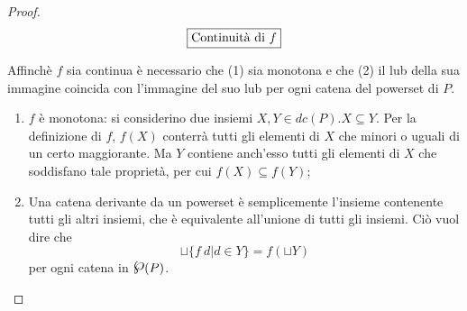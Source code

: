 \begin{proof}
$$
\boxed{\text{Continuità di } f}
$$

Affinchè $f$ sia continua è necessario che (1) sia monotona e che (2) il lub
della sua immagine coincida con l'immagine del suo lub per ogni catena del
powerset di $P$.

\begin{enumerate}
  \item $f$ è monotona: si considerino due insiemi
    $X,Y\in dc(P). X \subseteq Y$. Per la definizione di $f$, $f(X)$ conterrà
    tutti gli elementi di $X$ che minori o uguali di un certo maggiorante.
    Ma $Y$ contiene anch'esso tutti gli elementi di $X$ che soddisfano tale
    proprietà, per cui $f(X) \subseteq f(Y)$;
  \item Una catena derivante da un powerset è semplicemente l'insieme
    contenente tutti gli altri insiemi, che è equivalente all'unione di tutti
    gli insiemi. Ciò vuol dire che
    $$
    \sqcup\{f\ d | d \in Y\} = f(\sqcup Y)
    $$
    per ogni catena in $\powerset{P}$.
\end{enumerate}

\end{proof}

\undef{\powerset}
